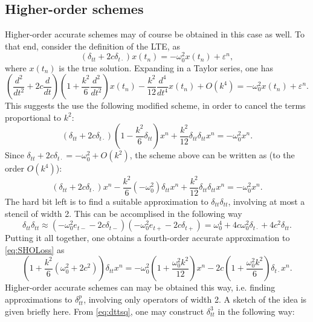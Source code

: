 \documentclass[11pt,twoside,a4paper,english]{book}
\newcommand{\etp}{e_{t+}}
\newcommand{\etm}{e_{t-}}
\newcommand{\dtp}{\delta_{t+}}
\newcommand{\dtm}{\delta_{t-}}
\newcommand{\dtd}{\delta_{t\cdot}}
\newcommand{\dtt}{\delta_{tt}}
\begin{document}
\subsection{Higher-order schemes}
Higher-order accurate schemes may of course be obtained in this case as well. To that end, consider the definition of the LTE, as
\begin{equation}
    \left(\dtt+2c\dtd \right) x(t_n) = - \omega_0^2 x(t_n) + \varepsilon^n,
\end{equation}
where $x(t_n)$ is the true solution. Expanding in a Taylor series, one has
\begin{equation}
    \left(\frac{d^2}{dt^2} + 2c \frac{d}{dt} \right)\left(1 + \frac{k^2}{6}\frac{d^2}{dt^2}\right)x(t_n) - \frac{k^2}{12}\frac{d^4}{dt^4}x(t_n) + O(k^4) = - \omega_0^2 x(t_n) + \varepsilon^n.
\end{equation}
This suggests the use the following modified scheme, in order to cancel the terms proportional to $k^2$:
\begin{equation}
    \left(\dtt + 2c \dtd \right)\left(1 - \frac{k^2}{6}\dtt\right)x^n + \frac{k^2}{12}\dtt\dtt x^n = -\omega_0^2 x^n.
\end{equation}
Since $\dtt + 2c \dtd  = -\omega_0^2 + O(k^2)$, the scheme above can be written as (to the order $O(k^4)$):
\begin{equation}
    \left(\dtt + 2c \dtd \right)x^n - \frac{k^2}{6}(-\omega_0^2) \dtt x^n + \frac{k^2}{12}\dtt \dtt x^n = -\omega_0^2 x^n.
\end{equation}
The hard bit left is to find a suitable approximation to $\dtt \dtt$, involving at most a stencil of width 2. This can be accomplised in the following way
\begin{equation}\label{eq:dttsq}
    \dtt \dtt \approx \left(-\omega_0^2 \etm -2c \dtm \right)\left(-\omega_0^2 \etp -2c \dtp \right) = \omega_0^4 + 4c \omega_0^2 \dtd + 4c^2 \dtt.
\end{equation}
Putting it all together, one obtains a fourth-order accurate approximation to \eqref{eq:SHOLoss} as
\begin{equation}
    \left(1 + \frac{k^2}{6}(\omega_0^2 + 2c^2) \right)\dtt x^n = -\omega_0^2\left(1 + \frac{\omega_0^2 k^2}{12} \right) x^n - 2c \left(1 + \frac{\omega_0^2k^2}{6} \right)\dtd x^n.
\end{equation}
Higher-order accurate schemes can may be obtained this way, i.e. finding approximations to $\dtt^p$, involving only operators of width 2. A sketch of the idea is given briefly here. From \eqref{eq:dttsq}, one may construct $\dtt^3$ in the following way:
\end{document}
